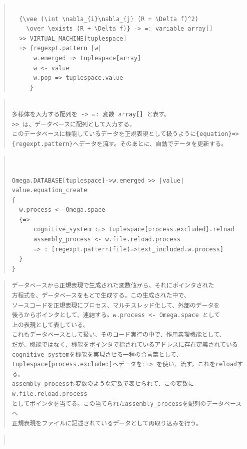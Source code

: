 \documentclass{jsarticle}
\begin{document}
{\begin{quote}
\setlength{\baselineskip}{12pt}
\begin{verbatim}

  {\vee (\int \nabla_{i}\nabla_{j} (R + \Delta f)^2) 
    \over \exists (R + \Delta f)} -> =: variable array[]  
  >> VIRTUAL_MACHINE[tuplespace] 
  => {regexpt.pattern |w|
      w.emerged => tuplespace[array]
      w <- value
      w.pop => tuplespace.value
     }
\end{verbatim}
\end{quote}


\begin{quote}
\setlength{\baselineskip}{12pt}
\begin{verbatim}
 
多様体を入力する配列を -> =: 変数 array[] と表す。
>> は、データベースに配列として入力する。
このデータベースに機能しているデータを正規表現として扱うように{equation}=>
{regexpt.pattern}へデータを流す。そのあとに、自動でデータを更新する。
\end{verbatim}
\end{quote}

\begin{quote}
\setlength{\baselineskip}{12pt}
\begin{verbatim}


Omega.DATABASE[tuplespace]->w.emerged >> |value| value.equation_create
{
  w.process <- Omega.space
  {=>
      cognitive_system :=> tuplespace[process.excluded].reload
      assembly_process <- w.file.reload.process
      => : [regexpt.pattern(file)=>text_included.w.process]
  }
}
\end{verbatim}
\end{quote}


\begin{quote}
\setlength{\baselineskip}{12pt}
\begin{verbatim}
データベースから正規表現で生成された変数値から、それにポインタされた
方程式を、データベースをもとで生成する。この生成された中で、
ソースコードを正規表現にプロセス、マルチスレッド化して、外部のデータを
後ろからポインタとして、連結する。w.process <- Omega.space として
上の表現として表している。
これもデータベースとして扱い、そのコード実行の中で、作用素環機能として、
だが、機能ではなく、機能をポインタで指されているアドレスに存在定義されている
cognitive_systemを機能を実現させる一種の合言葉として、
tuplespace[process.excluded]へデータを:=> を使い、流す。これをreloadする。
assembly_processも変数のような定数で表せられて、この変数にw.file.reload.process
としてポインタを当てる。この当てられたassembly_processを配列のデータベースへ
正規表現をファイルに記述されているデータとして再取り込みを行う。
\end{verbatim}
\end{quote}
\begin{quote}
\setlength{\baselineskip}{12pt}
\begin{verbatim}


\end{verbatim}
\end{quote}}
\end{document}
